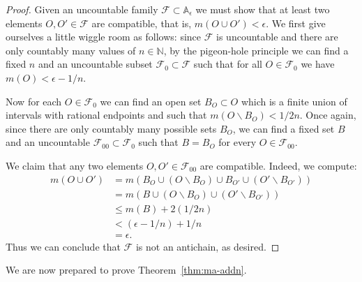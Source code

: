 \documentclass[11pt,oneside]{amsbook}
\newcommand{\N}{\mathbb N}
\theoremstyle{definition}
\theoremstyle{plain}
\theoremstyle{definition}
\theoremstyle{remark}
\numberwithin{equation}{section}
\numberwithin{figure}{section}
\begin{document}
\begin{proof}
  Given an uncountable family $\mathcal F\subset\mathbb A_\epsilon$ we must show that at least two elements $O,O'\in\mathcal F$ are compatible, that is, $m(O\cup O')<\epsilon$. We first give ourselves a little wiggle room as follows: since $\mathcal F$ is uncountable and there are only countably many values of $n\in\N$, by the pigeon-hole principle we can find a fixed $n$ and an uncountable subset $\mathcal F_0\subset\mathcal F$ such that for all $O\in\mathcal F_0$ we have $m(O)<\epsilon-1/n$.

  Now for each $O\in\mathcal F_0$ we can find an open set $B_O\subset O$ which is a finite union of intervals with rational endpoints and such that $m(O\smallsetminus B_O)<1/2n$. Once again, since there are only countably many possible sets $B_O$, we can find a fixed set $B$ and an uncountable $\mathcal F_{00}\subset\mathcal F_0$ such that $B=B_O$ for every $O\in\mathcal F_{00}$.

  We claim that any two elements $O,O'\in\mathcal F_{00}$ are compatible. Indeed, we compute:
  \begin{align*}
    m(O\cup O')&=m(B_O\cup(O\smallsetminus B_O)\cup B_{O'}\cup(O'\smallsetminus B_{O'}))\\
    &=m(B\cup(O\smallsetminus B_O)\cup(O'\smallsetminus B_{O'}))\\
    &\leq m(B)+2(1/2n)\\
    &<(\epsilon-1/n)+1/n\\
    &=\epsilon\text{.}
  \end{align*}
  Thus we can conclude that $\mathcal F$ is not an antichain, as desired.
\end{proof}

We are now prepared to prove Theorem~\ref{thm:ma-addn}.
\end{document}
